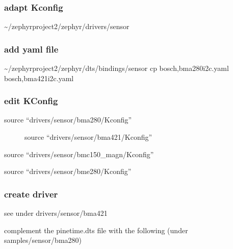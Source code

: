 \documentclass[letterpaper,10pt,english]{sphinxmanual}
\begin{document}
\subsubsection{adapt Kconfig}
\label{\detokenize{drivers/bma421:adapt-kconfig}}
\textasciitilde{}/zephyrproject\sphinxhyphen{}2/zephyr/drivers/sensor


\subsubsection{add yaml file}
\label{\detokenize{drivers/bma421:add-yaml-file}}
\textasciitilde{}/zephyrproject\sphinxhyphen{}2/zephyr/dts/bindings/sensor
cp bosch,bma280\sphinxhyphen{}i2c.yaml  bosch,bma421\sphinxhyphen{}i2c.yaml


\subsubsection{edit KConfig}
\label{\detokenize{drivers/bma421:edit-kconfig}}\begin{description}
\item[{source “drivers/sensor/bma280/Kconfig”}] \leavevmode
source “drivers/sensor/bma421/Kconfig”

\end{description}

source “drivers/sensor/bmc150\_magn/Kconfig”

source “drivers/sensor/bme280/Kconfig”


\subsubsection{create driver}
\label{\detokenize{drivers/bma421:create-driver}}
see under drivers/sensor/bma421

complement the pinetime.dts file with the following (under samples/sensor/bma280)

\begin{sphinxVerbatim}[commandchars=\\\{\}]
\end{sphinxVerbatim}
\end{document}
